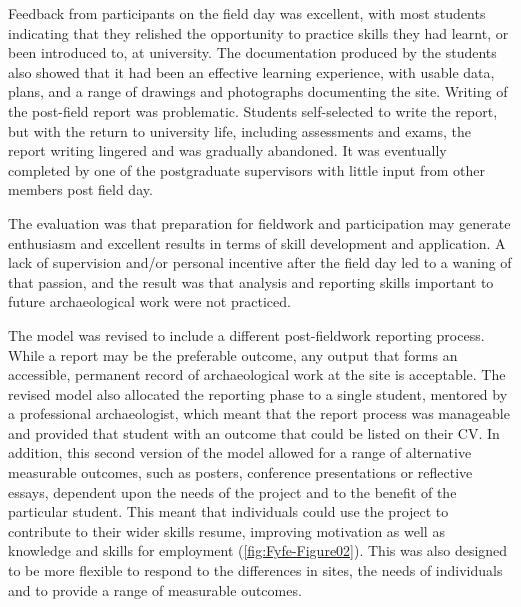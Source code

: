 \documentclass[%
]{ijsra}
\begin{document}
	
	Feedback from participants on the field day was excellent, with most students indicating that they relished the opportunity to practice skills they had learnt, or been introduced to, at university. 
	The documentation produced by the students also showed that it had been an effective learning experience, with usable data, plans, and a range of drawings and photographs documenting the site. 
	Writing of the post-field report was problematic. Students self-selected to write the report, but with the return to university life, including assessments and exams, the report writing lingered and was gradually abandoned. It was eventually completed by one of the postgraduate supervisors with little input from other members post field day.
	
	The evaluation was that preparation for fieldwork and participation may generate enthusiasm and excellent results in terms of skill development and application. 
	A lack of supervision and/or personal incentive after the field day led to a waning of that passion, and the result was that analysis and reporting skills important to future archaeological work were not practiced.
	
	The model was revised to include a different post-fieldwork reporting process. While a report may be the preferable outcome, any output that forms an accessible, permanent record of archaeological work at the site is acceptable. 
	The revised model also allocated the reporting phase to a single student, mentored by a professional archaeologist, which meant that the report process was manageable and provided that student with an outcome that could be listed on their CV. 
	In addition, this second version of the model allowed for a range of alternative measurable outcomes, such as posters, conference presentations or reflective essays, dependent upon the needs of the project and to the benefit of the particular student. 
	This meant that individuals could use the project to contribute to their wider skills resume, improving motivation as well as knowledge and skills for employment (\cref{fig:Fyfe-Figure02}). This was also designed to be more flexible to respond to the differences in sites, the needs of individuals and to provide a range of measurable outcomes.
	
\end{document}

